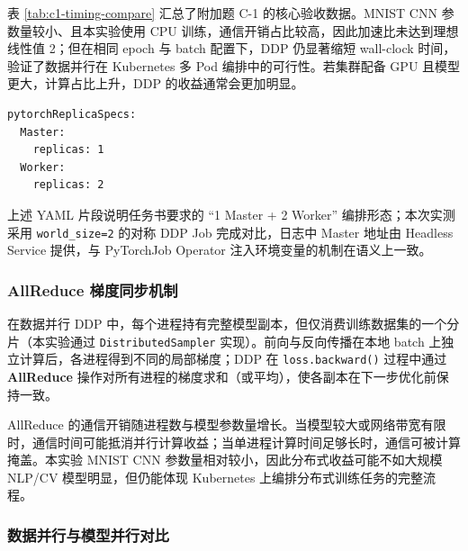 表 \ref{tab:c1-timing-compare} 汇总了附加题 C-1 的核心验收数据。MNIST CNN 参数量较小、且本实验使用 CPU 训练，通信开销占比较高，因此加速比未达到理想线性值 2；但在相同 epoch 与 batch 配置下，DDP 仍显著缩短 wall-clock 时间，验证了数据并行在 Kubernetes 多 Pod 编排中的可行性。若集群配备 GPU 且模型更大，计算占比上升，DDP 的收益通常会更加明显。

\begin{lstlisting}[caption={PyTorchJob / 多副本 Job 副本配置（节选）}, label=lst:c1-pytorchjob]
pytorchReplicaSpecs:
  Master:
    replicas: 1
  Worker:
    replicas: 2
\end{lstlisting}

上述 YAML 片段说明任务书要求的 ``1 Master + 2 Worker'' 编排形态；本次实测采用 \verb|world_size=2| 的对称 DDP Job 完成对比，日志中 Master 地址由 Headless Service 提供，与 PyTorchJob Operator 注入环境变量的机制在语义上一致。

\subsubsection{AllReduce 梯度同步机制}

在数据并行 DDP 中，每个进程持有完整模型副本，但仅消费训练数据集的一个分片（本实验通过 \verb|DistributedSampler| 实现）。前向与反向传播在本地 batch 上独立计算后，各进程得到不同的局部梯度；DDP 在 \verb|loss.backward()| 过程中通过 \textbf{AllReduce} 操作对所有进程的梯度求和（或平均），使各副本在下一步优化前保持一致。

AllReduce 的通信开销随进程数与模型参数量增长。当模型较大或网络带宽有限时，通信时间可能抵消并行计算收益；当单进程计算时间足够长时，通信可被计算掩盖。本实验 MNIST CNN 参数量相对较小，因此分布式收益可能不如大规模 NLP/CV 模型明显，但仍能体现 Kubernetes 上编排分布式训练任务的完整流程。

\subsubsection{数据并行与模型并行对比}

